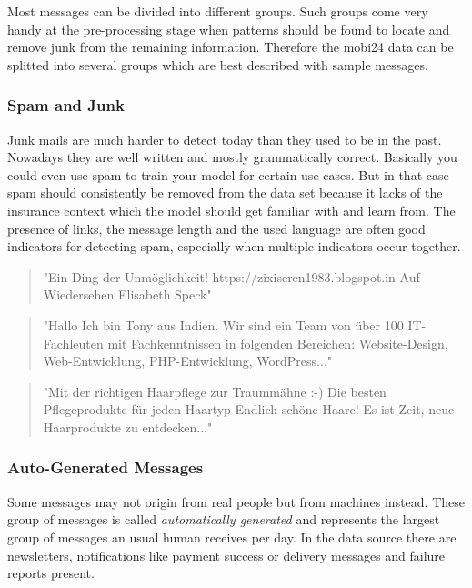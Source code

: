 Most messages can be divided into different groups. Such groups come very handy at the pre-processing stage when patterns should be
found to locate and remove junk from the remaining information. Therefore the mobi24 data can be splitted into several groups which
are best described with sample messages.

\subsubsection{Spam and Junk}

Junk mails are much harder to detect today than they used to be in the past. Nowadays they are well written and mostly grammatically
correct. Basically you could even use spam to train your model for certain use cases. But in that case spam should consistently be
removed from the data set because it lacks of the insurance context which the model should get familiar with and learn from. The
presence of links, the message length and the used language are often good indicators for detecting spam, especially when multiple
indicators occur together.

\begin{quote}
    "Ein Ding der Unmöglichkeit! https://zixiseren1983.blogspot.in Auf Wiedersehen Elisabeth Speck"
\end{quote}

\begin{quote}
    "Hallo Ich bin Tony aus Indien. Wir sind ein Team von über 100 IT-Fachleuten mit Fachkenntnissen in folgenden Bereichen: Website-Design, Web-Entwicklung, PHP-Entwicklung, WordPress..."
\end{quote}

\begin{quote}
    "Mit der richtigen Haarpflege zur Traummähne :-) Die besten Pflegeprodukte für jeden Haartyp Endlich schöne Haare! Es ist Zeit, neue Haarprodukte zu entdecken..."
\end{quote}

\subsubsection{Auto-Generated Messages}

Some messages may not origin from real people but from machines instead. These group of messages is called \emph{automatically generated}
and represents the largest group of messages an usual human receives per day. In the data source there are newsletters, notifications
like payment success or delivery messages and failure reports present.

